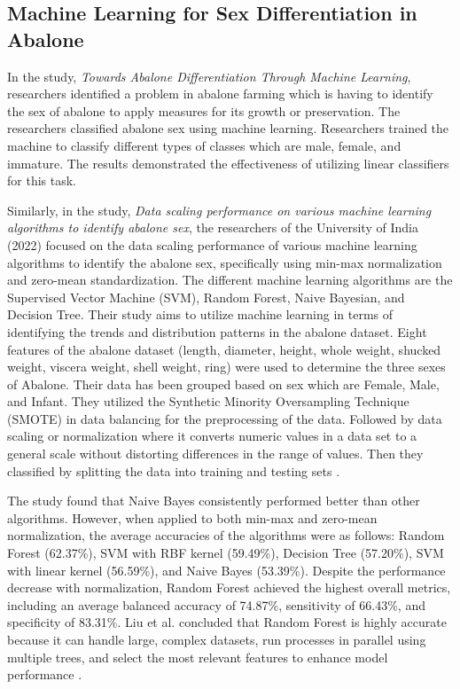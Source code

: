 \subsection{Machine Learning for Sex Differentiation in Abalone}
In the study, \textit{Towards Abalone Differentiation Through Machine Learning}, researchers identified a problem in abalone farming which is having to identify the sex of abalone to apply measures for its growth or preservation. The researchers classified abalone sex using machine learning. Researchers trained the machine to classify different types of classes which are male, female, and immature. The results demonstrated the effectiveness of utilizing linear classifiers for this task.

Similarly, in the study, \textit{Data scaling performance on various machine learning algorithms to identify abalone sex}, the researchers of the University of India (2022) focused on the data scaling performance of various machine learning algorithms to identify the abalone sex, specifically using min-max normalization and zero-mean standardization. The different machine learning algorithms are the Supervised Vector Machine (SVM), Random Forest, Naive Bayesian, and Decision Tree. Their study aims to utilize machine learning in terms of identifying the trends and distribution patterns in the abalone dataset. Eight features of the abalone dataset (length, diameter, height, whole weight, shucked weight, viscera weight, shell weight, ring) were used to determine the three sexes of Abalone. Their data has been grouped based on sex which are Female, Male, and Infant. They utilized the Synthetic Minority Oversampling Technique (SMOTE) in data balancing for the preprocessing of the data. Followed by data scaling or normalization where it converts numeric values in a data set to a general scale without distorting differences in the range of values. Then they classified by splitting the data into training and testing sets \cite{arifin2021}. 

The study found that Naive Bayes consistently performed better than other algorithms. However, when applied to both min-max and zero-mean normalization, the average accuracies of the algorithms were as follows: Random Forest (62.37\%), SVM with RBF kernel (59.49\%), Decision Tree (57.20\%), SVM with linear kernel (56.59\%), and Naive Bayes (53.39\%). Despite the performance decrease with normalization, Random Forest achieved the highest overall metrics, including an average balanced accuracy of 74.87\%, sensitivity of 66.43\%, and specificity of 83.31\%. Liu et al. concluded that Random Forest is highly accurate because it can handle large, complex datasets, run processes in parallel using multiple trees, and select the most relevant features to enhance model performance \cite{arifin2021}. 

